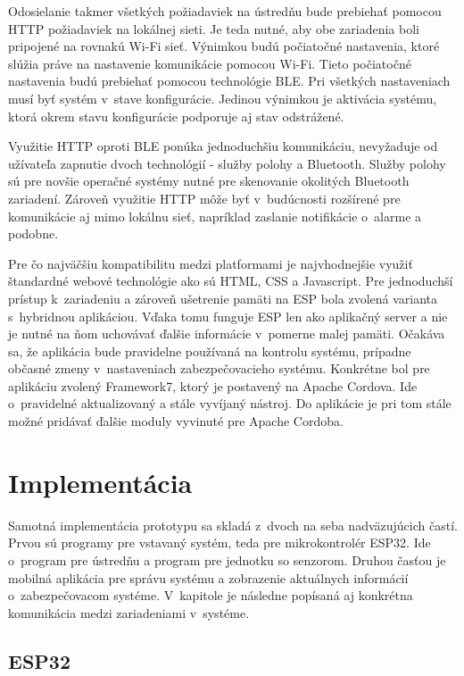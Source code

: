 Odosielanie takmer všetkých požiadaviek na ústredňu bude prebiehať pomocou HTTP požiadaviek na lokálnej sieti. Je teda nutné, aby obe zariadenia boli pripojené na rovnakú Wi-Fi sieť. Výnimkou budú počiatočné nastavenia, ktoré slúžia práve na nastavenie komunikácie pomocou Wi-Fi. Tieto počiatočné nastavenia budú prebiehať pomocou technológie BLE. Pri všetkých nastaveniach musí byť systém v~stave konfigurácie. Jedinou výnimkou je aktivácia systému, ktorá okrem stavu konfigurácie podporuje aj stav odstrážené.

Využitie HTTP oproti BLE ponúka jednoduchšiu komunikáciu, nevyžaduje od užívateľa zapnutie dvoch technológií - služby polohy a Bluetooth. Služby polohy sú pre novšie operačné systémy nutné pre skenovanie okolitých Bluetooth zariadení. Zároveň využitie HTTP môže byť v~budúcnosti rozšírené pre komunikácie aj mimo lokálnu sieť, napríklad zaslanie notifikácie o~alarme a podobne. 

Pre čo najväčšiu kompatibilitu medzi platformami je najvhodnejšie využiť štandardné webové technológie ako sú HTML, CSS a Javascript. Pre jednoduchší prístup k~zariadeniu a zároveň ušetrenie pamäti na ESP bola zvolená varianta s~hybridnou aplikáciou. Vďaka tomu funguje ESP len ako aplikačný server a nie je nutné na ňom uchovávať ďalšie informácie v~pomerne malej pamäti. Očakáva sa, že aplikácia bude pravidelne používaná na kontrolu systému, prípadne občasné zmeny v~nastaveniach zabezpečovacieho systému. Konkrétne bol pre aplikáciu zvolený Framework7, ktorý je postavený na Apache Cordova. Ide o~pravidelné aktualizovaný a stále vyvíjaný nástroj. Do aplikácie je pri tom stále možné pridávať ďalšie moduly vyvinuté pre Apache Cordoba.

\chapter{Implementácia}

Samotná implementácia prototypu sa skladá z~dvoch na seba nadväzujúcich častí. Prvou sú programy pre vstavaný systém, teda pre mikrokontrolér ESP32. Ide o~program pre ústredňu a program pre jednotku so senzorom. Druhou časťou je mobilná aplikácia pre správu systému a zobrazenie aktuálnych informácií o~zabezpečovacom systéme. V~kapitole je následne popísaná aj konkrétna komunikácia medzi zariadeniami v~systéme.

\section{ESP32}

